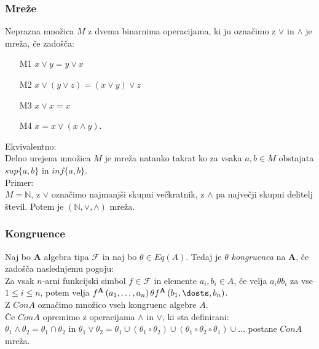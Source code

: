 \documentclass{beamer}
\begin{document}
\begin{frame}
\frametitle{Mreže}
    
    Neprazna množica $M$ z dvema binarnima operacijama, ki ju označimo z $\vee$ in $\wedge$ je mreža, če zadošča:\\
    \begin{enumerate} 
        \item[M1] $x \vee y = y \vee x$
        \item[M2] $x\vee \left(y \vee z\right) = \left(x \vee y\right)\vee z$
        \item[M3] $x \vee x = x$
        \item[M4] $x = x \vee \left(x \wedge y\right)$. \\
    \end{enumerate}
    Ekvivalentno: \\
        Delno urejena množica $M$ je mreža natanko takrat ko za vsaka $a, b \in M$ obstajata $sup\{a, b\}$ 
        in $inf\{a, b\}$.\\
    Primer:\\
    $M = \mathbb{N}$, z $\vee$ označimo najmanjši skupni večkratnik, z $\wedge$ pa največji skupni delitelj
    števil. Potem je $\left(\mathbb{N}, \vee, \wedge\right)$ mreža. 
    
\end{frame}
\begin{frame}
\frametitle{Kongruence}
Naj bo $\mathbf{A}$ algebra tipa $\mathcal{F}$ in naj bo $\theta \in Eq(A)$. Tedaj je $\theta$ \emph{kongruenca} 
na $\mathbf{A}$, če zadošča naslednjemu pogoju: \\
Za vsak $n$-arni funkcijski simbol $f \in \mathcal{F}$ in elemente $a_i, b_i \in A$, če velja $a_i\theta b_i$ 
za vse $1 \leq i \leq n$, potem velja $f^\mathbf{A}\left(a_1, \dots, a_n\right) \theta 
f^\mathbf{A}\left(b_1, \dosts, b_n\right)$.\\
Z $Con A$ označimo množico vseh kongruenc algebre $A$.
\\

Če $Con A$ opremimo z operacijama $\wedge$ in $\vee$, ki sta definirani:\\
$\theta_1 \wedge \theta_2 = \theta_1 \cap \theta_2$ in $\theta_1 \vee \theta_2 = \theta_1 \cup \left(\theta_1 \circ \theta_2\right)
\cup \left(\theta_1 \circ \theta_2 \circ \theta_1\right) \cup \dots$ postane $Con A$ mreža.
\end{frame}
\end{document}
